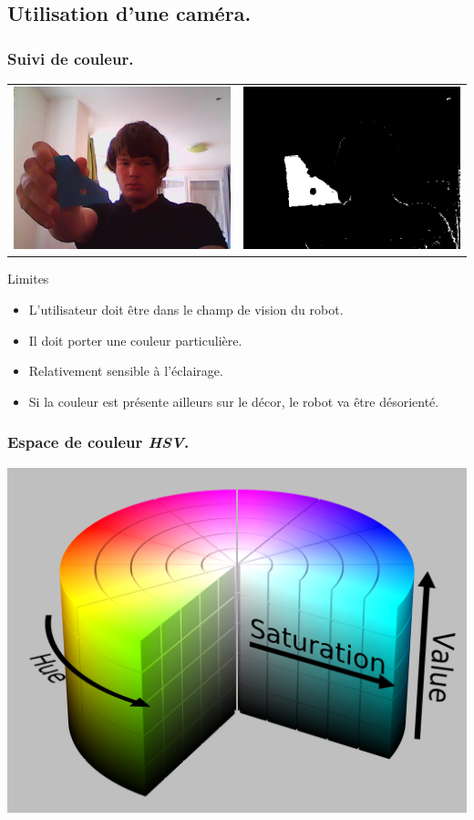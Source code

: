 \subsection[Caméra]{Utilisation d'une caméra.}
\begin{frame}
    \frametitle{Suivi de couleur.}
    \begin{tabular}{cc}
        \includegraphics[width=.4\linewidth]{rcs/follow_bef.png} & \includegraphics[width=.4\linewidth]{rcs/follow_aft.png} \\
    \end{tabular}
     { \begin{alertblock}{Limites}
            \begin{itemize}
                \pause \item L'utilisateur doit être dans le champ de vision du robot.
                \pause \item Il doit porter une couleur particulière.
                \pause \item Relativement sensible à l'éclairage.
                \pause \item Si la couleur est présente ailleurs sur le décor, le robot va être désorienté.
            \end{itemize}
    \end{alertblock} }
\end{frame}

\begin{frame}
    \frametitle{Espace de couleur \emph{HSV}.}
    \begin{center}
        \includegraphics[width=.8\linewidth]{rcs/hsv.png}
    \end{center}
\end{frame}


